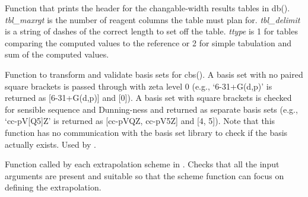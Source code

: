 \documentclass[letterpaper,10pt,english]{sphinxmanual}
\begin{document}

\begin{fulllineitems}
\label{index:wrappers.tblhead}
Function that prints the header for the changable-width results tables in db().
\emph{tbl\_maxrgt} is the number of reagent columns the table must plan for. \emph{tbl\_delimit}
is a string of dashes of the correct length to set off the table. \emph{ttype} is 1 for
tables comparing the computed values to the reference or 2 for simple tabulation
and sum of the computed values.

\end{fulllineitems}


\begin{fulllineitems}
\label{index:wrappers.validate_bracketed_basis}
Function to transform and validate basis sets for cbs(). A basis set with no
paired square brackets is passed through with zeta level 0 (e.g., `6-31+G(d,p)'
is returned as {[}6-31+G(d,p){]} and {[}0{]}). A basis set with square brackets is
checked for sensible sequence and Dunning-ness and returned as separate basis
sets (e.g., `cc-pV{[}Q5{]}Z' is returned as {[}cc-pVQZ, cc-pV5Z{]} and {[}4, 5{]}). Note
that this function has no communication with the basis set library to check
if the basis actually exists. Used by {\hyperref[index:wrappers.complete_basis_set]{}}.

\end{fulllineitems}


\begin{fulllineitems}
\label{index:wrappers.validate_scheme_args}
Function called by each extrapolation scheme in {\hyperref[index:wrappers.complete_basis_set]{}}.
Checks that all the input arguments are present and suitable so that
the scheme function can focus on defining the extrapolation.

\end{fulllineitems}
\end{document}
